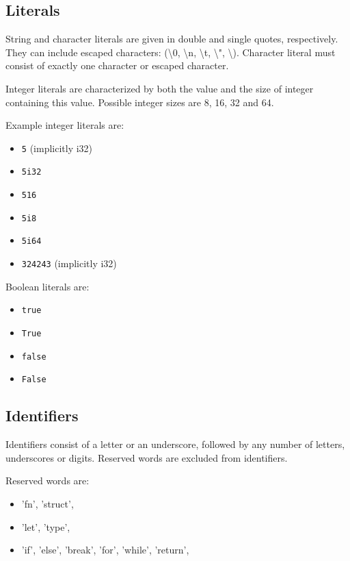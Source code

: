 \documentclass[times, utf8, diplomski]{fer}
\theoremstyle{definition}
\begin{document}
\subsection{Literals}

String and character literals are given in double and single quotes, respectively.
They can include escaped characters:  (\textbackslash 0, \textbackslash n, \textbackslash t, 
\textbackslash ", \textbackslash \textquotesingle). 
Character literal must consist of exactly one character or escaped character.

Integer literals are characterized by both the value and the size of integer containing this value.
Possible integer sizes are 8, 16, 32 and 64.

Example integer literals are:
\begin{itemize}
    \item \texttt{5} (implicitly i32)
    \item \texttt{5i32}
    \item \texttt{516}
    \item \texttt{5i8}
    \item \texttt{5i64}
    \item \texttt{324243} (implicitly i32)
\end{itemize}

Boolean literals are:

\begin{itemize}
    \item \texttt{true}
    \item \texttt{True}
    \item \texttt{false}
    \item \texttt{False}
\end{itemize}

\subsection{Identifiers}

Identifiers consist of a letter or an underscore, followed by any number of letters, underscores or digits.
Reserved words are excluded from identifiers.

Reserved words are:
\begin{itemize}
    \item 'fn', 'struct',
    \item 'let', 'type',
    \item 'if', 'else', 'break', 'for', 'while', 'return',
\end{itemize}
\end{document}
